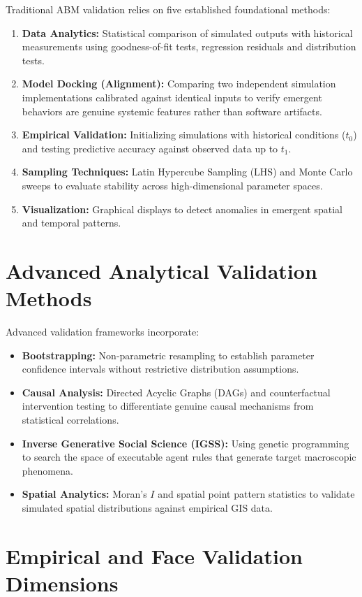 \documentclass[12pt,a4paper]{report}
\begin{document}
Traditional ABM validation relies on five established foundational methods:
\begin{enumerate}[label=\arabic*.]
    \item \textbf{Data Analytics:} Statistical comparison of simulated outputs with historical measurements using goodness-of-fit tests, regression residuals and distribution tests.
    \item \textbf{Model Docking (Alignment):} Comparing two independent simulation implementations calibrated against identical inputs to verify emergent behaviors are genuine systemic features rather than software artifacts.
    \item \textbf{Empirical Validation:} Initializing simulations with historical conditions ($t_0$) and testing predictive accuracy against observed data up to $t_1$.
    \item \textbf{Sampling Techniques:} Latin Hypercube Sampling (LHS) and Monte Carlo sweeps to evaluate stability across high-dimensional parameter spaces.
    \item \textbf{Visualization:} Graphical displays to detect anomalies in emergent spatial and temporal patterns.
\end{enumerate}

\section{Advanced Analytical Validation Methods}
\label{sec:advanced_val}

Advanced validation frameworks incorporate:
\begin{itemize}
    \item \textbf{Bootstrapping:} Non-parametric resampling to establish parameter confidence intervals without restrictive distribution assumptions.
    \item \textbf{Causal Analysis:} Directed Acyclic Graphs (DAGs) and counterfactual intervention testing to differentiate genuine causal mechanisms from statistical correlations.
    \item \textbf{Inverse Generative Social Science (IGSS):} Using genetic programming to search the space of executable agent rules that generate target macroscopic phenomena.
    \item \textbf{Spatial Analytics:} Moran's $I$ and spatial point pattern statistics to validate simulated spatial distributions against empirical GIS data.
\end{itemize}

\section{Empirical and Face Validation Dimensions}
\label{sec:empirical_face}
\end{document}
